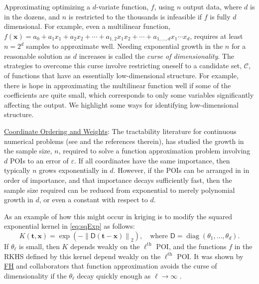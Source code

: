 \documentclass[11pt]{NSFamsart}
\newcommand{\Upara}[1]{\noindent\underline{\upshape #1}:}
\newcommand{\FH}{\hyperlink{FHlink}{FH}\xspace}
\DeclareMathOperator{\diag}{diag}
\newcommand{\mD}{\mathsf{D}}
\newcommand{\bx}{{\boldsymbol{x}}}
\newcommand{\bt}{{\boldsymbol{t}}}
\newcommand{\calc}{{\mathcal{C}}}
\newcommand{\norm}[2][{}]{\ensuremath{\left \lVert #2 \right \rVert}_{#1}}
\begin{document}
Approximating optimizing a $d$-variate function, $f$, using $n$ output data, where $d$ is in the dozens, and $n$ is restricted to the thousands is infeasible if $f$ is fully $d$ dimensional. For example, even a multilinear function, $f(\bx) = a_0 + a_1 x_1 + a_2 x_2 + \cdots + a_{1,2} x_1 x_2 + \cdots + a_{1,\ldots, d}x_1 \cdots x_d$,
requires at least $n = 2^d$ samples to approximate well. Needing exponential growth in the $n$ for a reasonable solution as $d$ increases is called the \emph{curse of dimensionality}. The strategies to overcome this curse involve restricting oneself to a candidate set, $\calc$, of functions that have an essentially low-dimensional structure.   For example, there is hope in approximating the multilinear function well if some of the coefficients are quite small, which corresponds to only some variables significantly affecting the output.  We highlight some ways for identifying low-dimensional structure.

\Upara{Coordinate Ordering and Weights}
The tractability literature for continuous numerical problems (see \cite{DicEtal14a,NovWoz08a, NovWoz10a, NovWoz12a} and the references therein), has studied the growth in the sample size, $n$, required to solve a function approximation problem involving $d$ POIs to an error of $\varepsilon$. If all coordinates have the same importance, then typically $n$ grows exponentially in $d$. However, if the POIs can be arranged in in order of importance, and that importance  decays sufficiently fast, then the sample size required can be reduced from exponential to merely polynomial growth in $d$, or even a constant with respect to $d$.

As an example of how this might occur in kriging is to modify the squared exponential kernel in \eqref{eq:sqExp} as follows:
\begin{equation} \label{eq:multisqExpD}
K(\bt,\bx) = \exp(-\norm[2]{\mD(\bt-\bx)}), \quad \text{where } \mD = \diag(\theta_1, \ldots, \theta_d).
\end{equation}
If $\theta_\ell$ is small, then $K$ depends weakly on the $\ell^{\text{th}}$ POI, and the functions $f$ in the RKHS defined by this kernel depend weakly on the $\ell^{\text{th}}$ POI. It was shown by \FH and collaborators that function approximation avoids the curse of dimensionality if the $\theta_\ell$ decay quickly enough as $\ell \to \infty$ \cite{FasHicWoz12b, FasHicWoz12a}.
\end{document}
